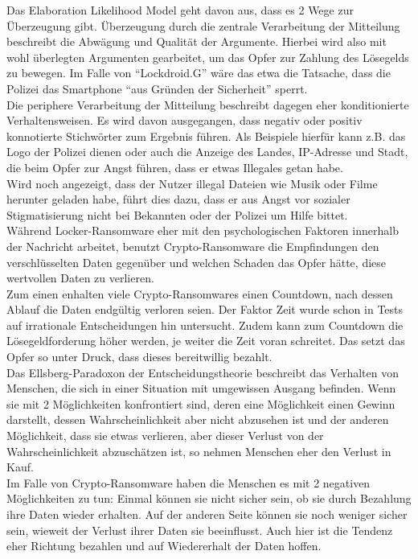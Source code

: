Das Elaboration Likelihood Model geht davon aus, dass es 2 Wege zur Überzeugung gibt. Überzeugung durch die zentrale Verarbeitung der Mitteilung beschreibt die Abwägung und Qualität der Argumente. Hierbei wird also mit wohl überlegten Argumenten gearbeitet, um das Opfer zur Zahlung des Lösegelds zu bewegen. Im Falle von ``Lockdroid.G'' wäre das etwa die Tatsache, dass die Polizei das Smartphone ``aus Gründen der Sicherheit'' sperrt.\\
Die periphere Verarbeitung der Mitteilung beschreibt dagegen eher konditionierte Verhaltensweisen. Es wird davon ausgegangen, dass negativ oder positiv konnotierte Stichwörter zum Ergebnis führen. Als Beispiele hierfür kann z.B. das Logo der Polizei dienen oder auch die Anzeige des Landes, IP-Adresse und Stadt, die beim Opfer zur Angst führen, dass er etwas Illegales getan habe. \\

Wird noch angezeigt, dass der Nutzer illegal Dateien wie Musik oder Filme herunter geladen habe, führt dies dazu, dass er aus Angst vor sozialer Stigmatisierung nicht bei Bekannten oder der Polizei um Hilfe bittet.\\

Während Locker-Ransomware eher mit den psychologischen Faktoren innerhalb der Nachricht arbeitet, benutzt Crypto-Ransomware die Empfindungen den verschlüsselten Daten gegenüber und welchen Schaden das Opfer hätte, diese wertvollen Daten zu verlieren.\\

Zum einen enhalten viele Crypto-Ransomwares einen Countdown, nach dessen Ablauf die Daten endgültig verloren seien. Der Faktor Zeit wurde schon in Tests auf irrationale Entscheidungen hin untersucht. Zudem kann zum Countdown die Lösegeldforderung höher werden, je weiter die Zeit voran schreitet. Das setzt das Opfer so unter Druck, dass dieses bereitwillig bezahlt.\\
Das Ellsberg-Paradoxon der Entscheidungstheorie beschreibt das Verhalten von Menschen, die sich in einer Situation mit umgewissen Ausgang befinden. Wenn sie mit 2 Möglichkeiten konfrontiert sind, deren eine Möglichkeit einen Gewinn darstellt, dessen Wahrscheinlichkeit aber nicht abzusehen ist und der anderen Möglichkeit, dass sie etwas verlieren, aber dieser Verlust von der Wahrscheinlichkeit abzuschätzen ist, so nehmen Menschen eher den Verlust in Kauf.\\
Im Falle von Crypto-Ransomware haben die Menschen es mit 2 negativen Möglichkeiten zu tun: Einmal können sie nicht sicher sein, ob sie durch Bezahlung ihre Daten wieder erhalten. Auf der anderen Seite können sie noch weniger sicher sein, wieweit der Verlust ihrer Daten sie beeinflusst. Auch hier ist die Tendenz eher Richtung bezahlen und auf Wiedererhalt der Daten hoffen.

